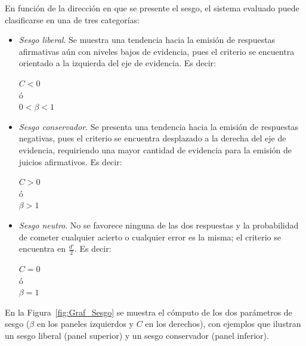 \begin{itemize}
En función de la dirección en que se presente el sesgo, el sistema evaluado puede clasificarse en una de tres categorías:\\

\begin{itemize}
\item \textsl{Sesgo liberal}. Se muestra una tendencia hacia la emisión de respuestas afirmativas aún con niveles bajos de evidencia, pues el criterio se encuentra orientado a la izquierda del eje de evidencia. Es decir: \\
\begin{center}
$C < 0$\\
ó\\
$0 < \beta < 1$\\
\end{center}

\item \textsl{Sesgo conservador}. Se presenta una tendencia hacia la emisión de respuestas negativas, pues el criterio se encuentra desplazado a la derecha del eje de evidencia, requiriendo una mayor cantidad de evidencia para la emisión de juicios afirmativos. Es decir: \\
\begin{center}
$C > 0$\\
ó\\
$\beta > 1$\\
\end{center}

\item \textsl{Sesgo neutro}. No se favorece ninguna de las dos respuestas y la probabilidad de cometer cualquier acierto o cualquier error es la misma; el criterio se encuentra en $\frac{d'}{2}$. Es decir: \\
\begin{center}
$C = 0$\\
ó\\
$\beta = 1$\\
\end{center}
\end{itemize}

En la Figura~\ref{fig:Graf_Sesgo} se muestra el cómputo de los dos parámetros de sesgo ($\beta$ en los paneles izquierdos y $C$ en los derechos), con ejemplos que ilustran un sesgo liberal (panel superior) y un sesgo conservador (panel inferior).\\


\end{itemize}
